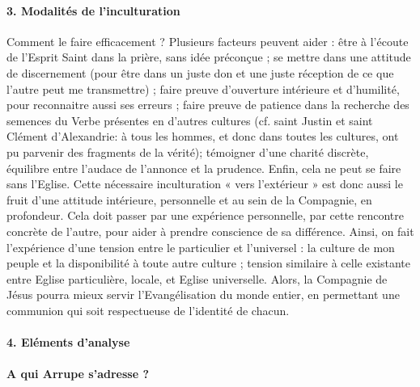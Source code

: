 \paragraph{3.	Modalités de l’inculturation
}

Comment le faire efficacement ? Plusieurs facteurs peuvent aider : être à l’écoute de l’Esprit Saint dans la prière, sans idée préconçue ; se mettre dans une attitude de discernement (pour être dans un juste don et une juste réception de ce que l’autre peut me transmettre) ; faire preuve d’ouverture intérieure et d’humilité, pour reconnaitre aussi ses erreurs ; faire preuve de patience dans la recherche des semences du Verbe présentes en d’autres cultures (cf. saint Justin et saint Clément d’Alexandrie: à tous les hommes, et donc dans toutes les cultures, ont pu parvenir des fragments de la vérité); témoigner d’une charité discrète, équilibre entre l’audace de l’annonce et la prudence. Enfin, cela ne peut se faire sans l’Eglise.
Cette nécessaire inculturation « vers l’extérieur » est donc aussi le fruit d’une attitude intérieure, personnelle et au sein de la Compagnie, en profondeur. Cela doit passer par une expérience personnelle, par cette rencontre concrète de l’autre, pour aider à prendre conscience de sa différence. Ainsi, on fait l’expérience d’une tension entre le particulier et l’universel : la culture de mon peuple et la disponibilité à toute autre culture ; tension similaire à celle existante entre Eglise particulière, locale, et Eglise universelle. Alors, la Compagnie de Jésus pourra mieux servir l’Evangélisation du monde entier, en permettant une communion qui soit respectueuse de l’identité de chacun.

 \paragraph{4.	Eléments d’analyse
}

\paragraph{A qui Arrupe s'adresse ?}


